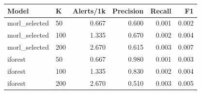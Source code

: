 \begin{tabular}{llrrrr}
\hline
Model & K & Alerts/1k & Precision & Recall & F1 \\
\hline
morl_selected & 50 & 0.667 & 0.600 & 0.001 & 0.002 \\
morl_selected & 100 & 1.335 & 0.670 & 0.002 & 0.004 \\
morl_selected & 200 & 2.670 & 0.615 & 0.003 & 0.007 \\
iforest & 50 & 0.667 & 0.980 & 0.001 & 0.003 \\
iforest & 100 & 1.335 & 0.830 & 0.002 & 0.004 \\
iforest & 200 & 2.670 & 0.510 & 0.003 & 0.005 \\
\hline
\end{tabular}
